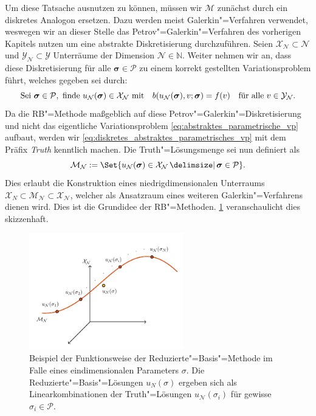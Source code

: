\documentclass[../main.tex]{subfiles}
\begin{document}
Um diese Tatsache ausnutzen zu können, müssen wir $\mathcal M$ zunächst durch ein diskretes Analogon ersetzen.
Dazu werden meist Galerkin"=Verfahren verwendet, weswegen wir an dieser Stelle das Petrov"=Galerkin"=Verfahren des vorherigen Kapitels nutzen um eine abstrakte Diskretisierung durchzuführen.
Seien $\mathcal X_{\mathcal N} \subset \mathcal N$ und $\mathcal Y_{\mathcal N} \subset \mathcal Y$ Unterräume der Dimension $\mathcal N \in \mathbb{N}$.
Weiter nehmen wir an, dass diese Diskretisierung für alle $\bm \sigma \in \mathcal P$ zu einem korrekt gestellten Variationsproblem führt, welches gegeben sei durch:
\begin{equation}
\label{eq:diskretes_abstraktes_parametrisches_vp}
    \text{Sei } \bm \sigma \in \mathcal P, \text{ finde } u_{\mathcal N}(\bm \sigma) \in \mathcal X_{\mathcal N} \text{ mit} \quad b(u_{\mathcal N}(\bm \sigma), v; \bm \sigma) = f(v) \quad \fa v \in \mathcal Y_{\mathcal N}.
\end{equation}
Da die RB"=Methode maßgeblich auf diese Petrov"=Galerkin"=Diskretisierung und nicht das eigentliche Variationsproblem \cref{eq:abstraktes_parametrische_vp} aufbaut, werden wir \cref{eq:diskretes_abstraktes_parametrisches_vp} mit dem Präfix \emph{Truth} kenntlich machen.
Die Truth"=Lösungsmenge sei nun definiert als
\begin{equation}
\label{eq:truth_loesungsmenge}
    \mathcal M_{\mathcal N} := \Set{u_{\mathcal N}(\bm \sigma) \in \mathcal X_{\mathcal N} \given \bm \sigma \in \mathcal P}.
\end{equation}
Dies erlaubt die Konstruktion eines niedrigdimensionalen Unterraums $\mathcal X_{N} \subset \mathcal M_{\mathcal N} \subset \mathcal X_{\mathcal N}$, welcher als Ansatzraum eines weiteren Galerkin"=Verfahrens dienen wird.
Dies ist die Grundidee der RB"=Methoden.
\cref{figure:rbm_loesungsmenge} veranschaulicht dies skizzenhaft.

\begin{figure}[tb]
    \centering
    \includegraphics[width=0.6\textwidth]{figures/rb.pdf}
    \caption[%
    Skizze zur Motivation der Reduzierte-Basis-Methode.
    ]{
        Beispiel der Funktionsweise der Reduzierte"=Basis"=Methode im Falle eines eindimensionalen Parameters $\sigma$.
        Die Reduzierte"=Basis"=Lösungen $u_{N}(\sigma)$ ergeben sich als Linearkombinationen der Truth"=Lösungen $u_{\mathcal N}(\sigma_{i})$ für gewisse $\sigma_{i} \in \mathcal P$.
        }
    \label{figure:rbm_loesungsmenge}
\end{figure}
\end{document}
